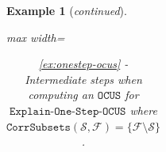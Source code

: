 \documentclass[twoside,11pt]{article}
\newcommand\m[1]{\mathcal{#1}}
\newtheorem{example}{Example}
\newcommand\comment[1]{\marginpar{\tiny #1}}
\renewcommand\comment[1]{#1}
\newcommand{\emilio}[1]{{\comment{\color{red}Emilio: #1}}}
\newcommand{\bart}[1]{{\comment{\color{OliveGreen}Bart: #1}}}
\newcommand\setstohit{\ensuremath{\m{H} }\xspace}
\newcommand\formula{\ensuremath{\m{F} }\xspace}
\newcommand\mm[1]{\ensuremath{#1}\xspace}
\newcommand\call[1]{\mm{\texttt{#1}}}
\newcommand\sat{\texttt{{SAT}}\xspace}
\newcommand\comus{\mm{\call{OCUS}}}
\newcommand\corrsubsets{\mm{\call{CorrSubsets}}}
\newcommand\onestepo{\ensuremath{\call{Explain-One-Step-OCUS}}\xspace}
\begin{document}
\begin{example}[\textit{continued}]
\begin{table}[!h]
\begin{adjustbox}{max width=\textwidth}
\begin{tabular}{lccc}
	\end{tabular}\end{adjustbox}
	\caption{
		\cref{ex:onestep-ocus} - Intermediate steps when computing an \comus for \onestepo where $\corrsubsets(\m{S}, \formula) = \{\formula \setminus \m{S}\}$.
	}
	\label{tab:example-explanation-generation-not-incremental}
\end{table}
%
%			

\end{example}
\end{document}
